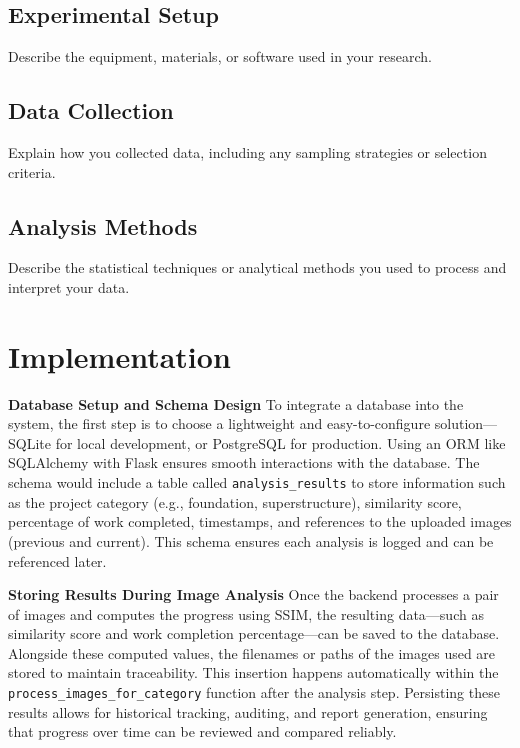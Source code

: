 \documentclass[12pt,a4paper]{report}
\begin{document}
\section{Experimental Setup}
Describe the equipment, materials, or software used in your research.

\section{Data Collection}
Explain how you collected data, including any sampling strategies or selection criteria.

\section{Analysis Methods}
Describe the statistical techniques or analytical methods you used to process and interpret your data.

\chapter{Implementation}
\label{chap:implementation}

\setlength{\baselineskip}{1.5\baselineskip}

\textbf{Database Setup and Schema Design}
To integrate a database into the system, the first step is to choose a lightweight and easy-to-configure solution—SQLite for local development, or PostgreSQL for production. Using an ORM like SQLAlchemy with Flask ensures smooth interactions with the database. The schema would include a table called \texttt{analysis\_results} to store information such as the project category (e.g., foundation, superstructure), similarity score, percentage of work completed, timestamps, and references to the uploaded images (previous and current). This schema ensures each analysis is logged and can be referenced later.

\textbf{Storing Results During Image Analysis}
Once the backend processes a pair of images and computes the progress using SSIM, the resulting data—such as similarity score and work completion percentage—can be saved to the database. Alongside these computed values, the filenames or paths of the images used are stored to maintain traceability. This insertion happens automatically within the \texttt{process\_images\_for\_category} function after the analysis step. Persisting these results allows for historical tracking, auditing, and report generation, ensuring that progress over time can be reviewed and compared reliably.
\end{document}
